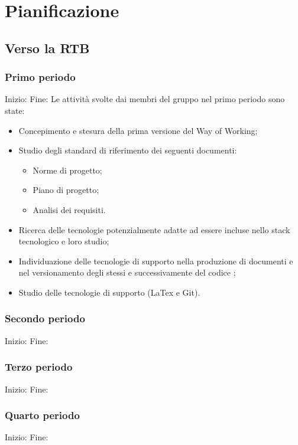 
\section{Pianificazione}
\subsection{Verso la RTB}
\subsubsection{Primo periodo}
Inizio: \hline
Fine: \hline
{}
Le attività svolte dai membri del gruppo nel primo periodo sono state:
\begin{itemize}
    \item Concepimento e stesura della prima versione del Way of Working;
    \item Studio degli standard di riferimento dei seguenti documenti:
    \begin{itemize}
        \item Norme di progetto;
        \item Piano di progetto;
        \item Analisi dei requisiti.
    \end{itemize}
    \item Ricerca delle tecnologie potenzialmente adatte ad essere incluse nello
    stack tecnologico e loro studio;
    \item Individuazione delle tecnologie di supporto nella produzione di documenti 
    e nel versionamento degli stessi e successivamente del codice ;
    \item Studio delle tecnologie di supporto (LaTex e Git).
\end{itemize}
\subsubsection{Secondo periodo}
Inizio: \hline
Fine: \hline
{}
\subsubsection{Terzo periodo}
Inizio: \hline
Fine: \hline
{}
\subsubsection{Quarto periodo}
Inizio: \hline
Fine: \hline
{}
